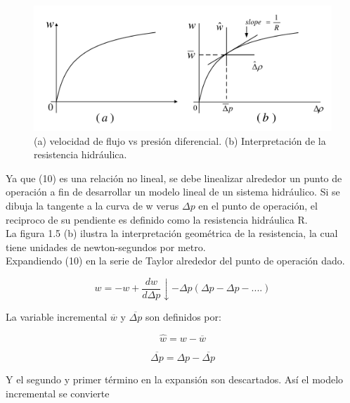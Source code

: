\documentclass[a4paper,12pt,twoside]{proyectotanquesecci}
\begin{document}
\begin{figure}[h]
\centering
\includegraphics[scale=0.5]{Figura5}
\renewcommand{\figurename}{Fig.}
\caption{(a) velocidad de flujo vs presión diferencial. (b) Interpretación de la resistencia hidráulica.}
\label{(a) velocidad de flujo vs presión diferencial. (b) Interpretación de la resistencia hidráulica.}
\end{figure}

Ya que (10) es una relación no lineal, se debe linealizar alrededor un punto de operación a fin de desarrollar un modelo lineal de un sistema hidráulico.
Si se dibuja la tangente a la curva de w verus $\Delta p$  en el punto de operación, el reciproco de su pendiente es definido como la resistencia hidráulica R. \\

La figura 1.5 (b) ilustra la interpretación geométrica de la resistencia, la cual tiene unidades de newton-segundos por metro.\\

Expandiendo (10) en la serie de Taylor alrededor del punto de operación dado.

\begin{equation}
w=-w+\frac{dw}{d\Delta p}\downarrow -\Delta p (\Delta p -\Delta p - ....)
\end{equation}

La variable incremental $\overline{w}$  y $\overline{\Delta p}$ son definidos por:

\begin{equation}
\widehat{w}=w-\overline{w}
\end{equation}

\begin{equation}
\overline{\Delta p}=\Delta p - \overline{\Delta p} 
\end{equation}

Y el segundo y primer término en la expansión son descartados. Así el modelo incremental se convierte
\end{document}
